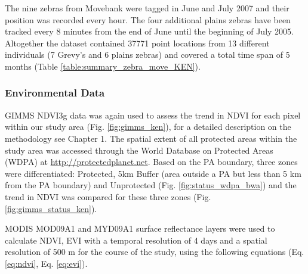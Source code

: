 \documentclass[12pt,a4paper, twoside, english]{article}
\begin{document}
The nine zebras from Movebank were tagged in June and July 2007 and their position was recorded every hour. The four additional plains zebras have been tracked every 8 minutes from the end of June until the beginning of July 2005. Altogether the dataset contained 37771 point locations from 13 different individuals (7 Grevy's and 6 plains zebras) and covered a total time span of 5 months (Table \ref{table:summary_zebra_move_KEN}).



\subsubsection{Environmental Data}

GIMMS NDVI3g data was again used to assess the trend in NDVI for each pixel within our study area (Fig. \ref{fig:gimms_ken}), for a detailed description on the methodology see Chapter 1. The spatial extent of all protected areas within the study area was accessed through the World Database on Protected Areas (WDPA) at \url{http://protectedplanet.net}. Based on the PA boundary, three zones were differentiated: Protected, 5km Buffer (area outside a PA but less than 5 km from the PA boundary) and Unprotected (Fig. \ref{fig:status_wdpa_bwa}) and the trend in NDVI was compared for these three zones (Fig. \ref{fig:gimms_status_ken}).


MODIS MOD09A1 and MYD09A1 surface reflectance layers were used to calculate NDVI, EVI with a temporal resolution of 4 days and a spatial resolution of 500 m for the course of the study, using the following equations (Eq. \ref{eq:ndvi}, Eq. \ref{eq:evi}).

\end{document}
